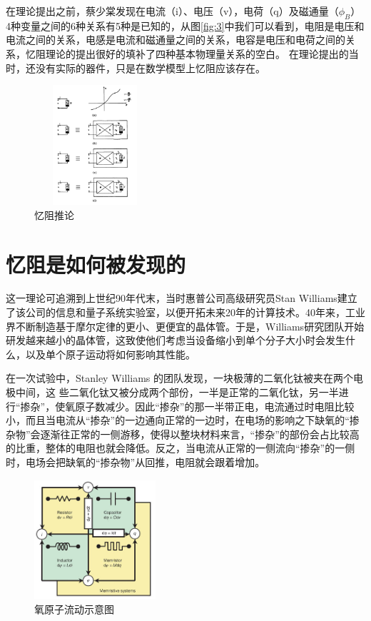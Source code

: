 \documentclass[UTF8]{article}
\begin{document}
在理论提出之前，蔡少棠发现在电流（i）、电压（v），电荷（q）及磁通量（$\phi_{B}$）4种变量之间的6种关系有5种是已知的，从图\eqref{fig:3}中我们可以看到，电阻是电压和电流之间的关系，电感是电流和磁通量之间的关系，电容是电压和电荷之间的关系，忆阻理论的提出很好的填补了四种基本物理量关系的空白。
在理论提出的当时，还没有实际的器件，只是在数学模型上忆阻应该存在。%

\begin{figure}[htbp]
\centering
\includegraphics[width=1.77in,height=1.75in]{pic/4}
\caption{忆阻推论}
\label{fig:4}
\end{figure}



\section{忆阻是如何被发现的}

这一理论可追溯到上世纪90年代末，当时惠普公司高级研究员Stan Williams建立了该公司的信息和量子系统实验室，以便开拓未来20年的计算技术。40年来，工业界不断制造基于摩尔定律的更小、更便宜的晶体管。于是，Williams研究团队开始研发越来越小的晶体管，这致使他们考虑当设备缩小到单个分子大小时会发生什么，以及单个原子运动将如何影响其性能。




在一次试验中，Stanley Williams 的团队发现，一块极薄的二氧化钛被夹在两个电极中间，这
些二氧化钛又被分成两个部份，一半是正常的二氧化钛，另一半进行“掺杂”，使氧原子数减少。因此“掺杂”的那一半带正电，电流通过时电阻比较小，而且当电流从“掺杂”的一边通向正常的一边时，在电场的影响之下缺氧的“掺杂物”会逐渐往正常的一侧游移，使得以整块材料来言，“掺杂”的部份会占比较高的比重，整体的电阻也就会降低。反之，当电流从正常的一侧流向“掺杂”的一侧时，电场会把缺氧的“掺杂物”从回推，电阻就会跟着增加。
\begin{figure}[htbp]
\centering
\includegraphics[width=1.77in,height=1.75in]{pic/memristor01.jpeg}

\caption{氧原子流动示意图}
\label{fig:graph}
\end{figure}
\end{document}
